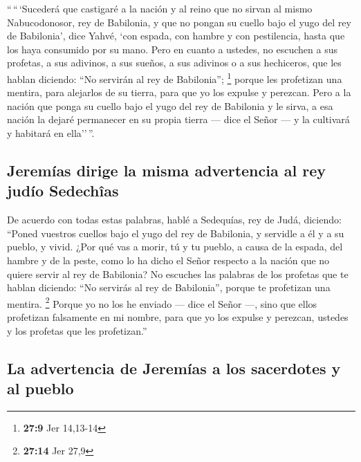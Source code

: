  ``\,``\,`Sucederá que castigaré a la nación y al reino
que no sirvan al mismo Nabucodonosor, rey de Babilonia, y que no pongan
su cuello bajo el yugo del rey de Babilonia', dice Yahvé, `con espada,
con hambre y con pestilencia, hasta que los haya consumido por su mano.
 Pero en cuanto a ustedes, no escuchen a sus profetas, a
sus adivinos, a sus sueños, a sus adivinos o a sus hechiceros, que les
hablan diciendo: ``No servirán al rey de Babilonia''; \footnote{\textbf{27:9}
  Jer 14,13-14}  porque les profetizan una mentira, para
alejarlos de su tierra, para que yo los expulse y perezcan.
 Pero a la nación que ponga su cuello bajo el yugo del
rey de Babilonia y le sirva, a esa nación la dejaré permanecer en su
propia tierra --- dice el Señor --- y la cultivará y habitará en
ella''\,''.

\hypertarget{jeremuxedas-dirige-la-misma-advertencia-al-rey-juduxedo-sedechuxeeas}{%
\subsection{Jeremías dirige la misma advertencia al rey judío
Sedechîas}\label{jeremuxedas-dirige-la-misma-advertencia-al-rey-juduxedo-sedechuxeeas}}

 De acuerdo con todas estas palabras, hablé a Sedequías,
rey de Judá, diciendo: ``Poned vuestros cuellos bajo el yugo del rey de
Babilonia, y servidle a él y a su pueblo, y vivid.  ¿Por
qué vas a morir, tú y tu pueblo, a causa de la espada, del hambre y de
la peste, como lo ha dicho el Señor respecto a la nación que no quiere
servir al rey de Babilonia?  No escuches las palabras de
los profetas que te hablan diciendo: ``No servirás al rey de
Babilonia'', porque te profetizan una mentira. \footnote{\textbf{27:14}
  Jer 27,9}  Porque yo no los he enviado --- dice el
Señor ---, sino que ellos profetizan falsamente en mi nombre, para que
yo los expulse y perezcan, ustedes y los profetas que les profetizan.''

\hypertarget{la-advertencia-de-jeremuxedas-a-los-sacerdotes-y-al-pueblo}{%
\subsection{La advertencia de Jeremías a los sacerdotes y al
pueblo}\label{la-advertencia-de-jeremuxedas-a-los-sacerdotes-y-al-pueblo}}

